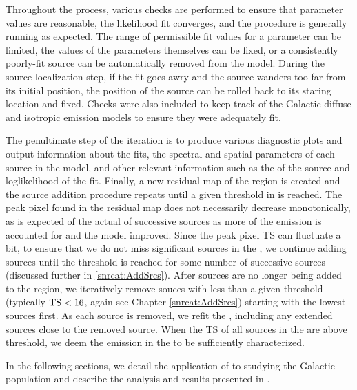 {Throughout the \srcs{} process, various checks are performed to ensure that parameter values are reasonable,
the likelihood fit converges, and the procedure is generally running as expected. The range of permissible fit values for a parameter can be limited, the values of the parameters themselves can be fixed, or a consistently poorly-fit source can be automatically removed from the model. During the source localization step, if the fit goes awry and the source wanders too far from its initial position, the position of the source can be rolled back to its staring location and fixed. Checks were also included to keep track of the Galactic diffuse and isotropic emission models to ensure they were adequately fit.

The penultimate step of the iteration is to produce various diagnostic plots and output information about the fits, the spectral and spatial parameters of each source in the model, and other relevant information such as the \ts{} of the source and loglikelihood of the fit. Finally, a new residual \ts{} map of the region is created and the source addition procedure repeats until a given threshold in \ts{} is reached. The peak pixel \ts{} found in the residual \ts{} map does not necessarily decrease monotonically, as is expected of the actual \ts{} of successive sources as more of the emission is accounted for and the model improved. Since the peak pixel TS can fluctuate a bit, to ensure that we do not miss significant sources in the \roi{}, we continue adding sources until the \ts{} threshold is reached for some number of successive sources (discussed further in \ref{snrcat:AddSrcs}). After sources are no longer being added to the region, we iteratively remove souces with \ts{} less than a given threshold (typically ${\rm TS < 16}$, again see Chapter \ref{snrcat:AddSrcs}) starting with the lowest \ts{} sources first. As each source is removed, we refit the \roi{}, including any extended sources close to the removed source. When the TS of all sources in the \roi{} are above threshold, we deem the emission in the \roi{} to be sufficiently characterized.

In the following sections, we detail the application of \srcs{} to studying the \gev{} Galactic \snr{} population and describe the analysis and results presented in \cite{snrCat}.


}
